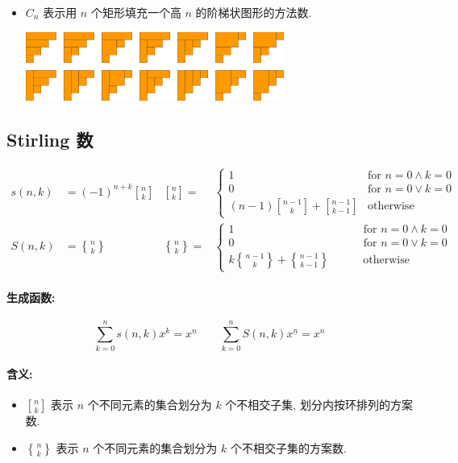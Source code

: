 \begin{itemize}
\begin{center}
    \end{center}
  \item $C_n$ 表示用 $n$ 个矩形填充一个高 $n$ 的阶梯状图形的方法数.
    \begin{center}
      \includegraphics[scale=.5,natwidth=320,natheight=85]{SEQ/320px-Catalan_stairsteps_4.svg.png}
    \end{center}
\end{itemize}

\clearpage
\subsection{Stirling 数}
\[
  \begin{aligned}
    s(n,k)&=(-1)^{n+k}\genfrac[]{0pt}0nk&\genfrac[]{0pt}0nk=&\begin{cases}
      1&\text{for }n=0\land k=0\\
      0&\text{for }n=0\lor k=0\\
      \displaystyle(n-1)\genfrac[]{0pt}0{n-1}k+\genfrac[]{0pt}0{n-1}{k-1}&\text{otherwise}
    \end{cases}\\
    S(n,k)&=\genfrac\{\}{0pt}0nk&\genfrac\{\}{0pt}0nk=&\begin{cases}
      1\qquad\qquad\qquad\qquad\qquad\quad\ \ \text{for }n=0\land k=0\\
      0\qquad\qquad\qquad\qquad\qquad\quad\ \ \text{for }n=0\lor k=0\\k
      \genfrac\{\}{0pt}0{n-1}k+\genfrac\{\}{0pt}0{n-1}{k-1}\qquad\quad\!\!\text{otherwise}
    \end{cases}
  \end{aligned}
\]
\paragraph{生成函数:}
\[\sum_{k=0}^ns(n,k)x^k=x^{\underline n}\qquad\sum_{k=0}^nS(n,k)x^{\underline n}=x^n\]
\paragraph{含义:}
\begin{itemize}
  \item $\genfrac[]{0pt}0nk$ 表示 $n$ 个不同元素的集合划分为 $k$ 个不相交子集, 划分内按环排列的方案数.
  \item $\genfrac\{\}{0pt}0nk$ 表示 $n$ 个不同元素的集合划分为 $k$ 个不相交子集的方案数.
\end{itemize}
